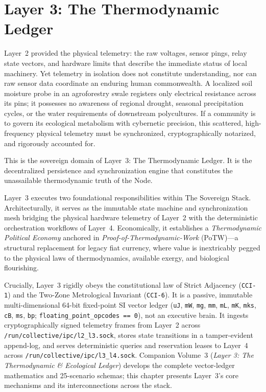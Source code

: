 \chapter{Layer 3: The Thermodynamic Ledger}
\label{ch:layer3}

Layer~2 provided the physical telemetry: the raw voltages, sensor pings, relay state vectors, and hardware limits that describe the immediate status of local machinery. Yet telemetry in isolation does not constitute understanding, nor can raw sensor data coordinate an enduring human commonwealth. A localized soil moisture probe in an agroforestry swale registers only electrical resistance across its pins; it possesses no awareness of regional drought, seasonal precipitation cycles, or the water requirements of downstream polycultures. If a community is to govern its ecological metabolism with cybernetic precision, this scattered, high-frequency physical telemetry must be synchronized, cryptographically notarized, and rigorously accounted for.

This is the sovereign domain of Layer~3: The Thermodynamic Ledger. It is the decentralized persistence and synchronization engine that constitutes the unassailable thermodynamic truth of the Node.

Layer~3 executes two foundational responsibilities within The Sovereign Stack. Architecturally, it serves as the immutable state machine and synchronization mesh bridging the physical hardware telemetry of Layer~2 with the deterministic orchestration workflows of Layer~4. Economically, it establishes a \textit{Thermodynamic Political Economy} anchored in \textit{Proof-of-Thermodynamic-Work} (PoTW)---a structural replacement for legacy fiat currency, where value is inextricably pegged to the physical laws of thermodynamics, available exergy, and biological flourishing.

Crucially, Layer~3 rigidly obeys the constitutional law of Strict Adjacency (\texttt{CCI-1}) and the Two-Zone Metrological Invariant (\texttt{CCI-6}). It is a passive, immutable multi-dimensional 64-bit fixed-point SI vector ledger (\texttt{uJ}, \texttt{mW}, \texttt{mg}, \texttt{mm}, \texttt{mL}, \texttt{mK}, \texttt{mks}, \texttt{cB}, \texttt{ms}, \texttt{bp}; \texttt{floating\_point\_opcodes == 0}), not an executive brain. It ingests cryptographically signed telemetry frames from Layer~2 across \texttt{/run/collective/ipc/l2\_l3.sock}, stores state transitions in a tamper-evident append-log, and serves deterministic queries and reservation leases to Layer~4 across \texttt{/run/collective/ipc/l3\_l4.sock}. Companion Volume~3 (\textit{Layer 3: The Thermodynamic \& Ecological Ledger}) develops the complete vector-ledger mathematics and 25-scenario schemas; this chapter presents Layer~3's core mechanisms and its interconnections across the stack.


